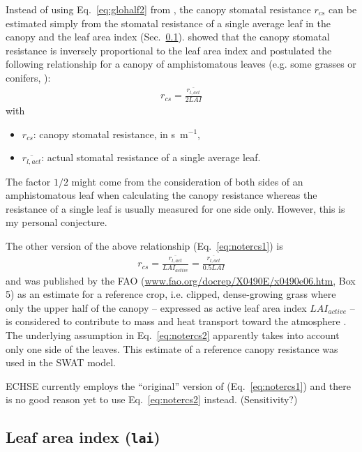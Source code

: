 \documentclass{scrreprt}
\newenvironment{denseitem}{
  \begin{itemize}
    \setlength{\itemsep}{0pt}
    \setlength{\parskip}{0pt}
    \setlength{\parsep}{0pt}
}{
  \end{itemize}
}
\begin{document}
Instead of using Eq.~\eqref{eq:glohalf2} from \citet{saugier91}, the canopy stomatal resistance $r_{cs}$ can be estimated simply from the stomatal resistance of a single average leaf in the canopy and the leaf area index (Sec.~\ref{ssec:parest_veg_lai}).
\citet{shuttleworth76} showed that the canopy stomatal resistance is inversely proportional to the leaf area index and postulated the following relationship for a canopy of amphistomatous leaves (e.g. some grasses or conifers, \citealt{shuttleworth85}):
\begin{align} \label{eq:notercs1}
  r_{cs} = \frac{\overline{r_{l,act}}}{2 LAI}
\end{align}
%
with
\begin{denseitem}
  \item[] $r_{cs}$: canopy stomatal resistance, in s~m$^{-1}$,
  \item[] $\overline{r_{l,act}}$: actual stomatal resistance of a single average leaf.
\end{denseitem}
%
The factor $1/2$ might come from the consideration of both sides of an amphistomatous leaf when calculating the canopy resistance whereas the resistance of a single leaf is usually measured for one side only.
However, this is my personal conjecture.

The other version of the above relationship (Eq.~\ref{eq:notercs1}) is
\begin{align} \label{eq:notercs2}
  r_{cs} = \frac{\overline{r_{l,act}}}{LAI_{active}} = \frac{\overline{r_{l,act}}}{0.5 LAI}
\end{align}
%
and was published by the FAO (\url{www.fao.org/docrep/X0490E/x0490e06.htm}, Box 5) as an estimate for a reference crop, i.e. clipped, dense-growing grass where only the upper half of the canopy -- expressed as active leaf area index $LAI_{active}$ -- is considered to contribute to mass and heat transport toward the atmosphere \citep{fao98}.
The underlying assumption in Eq.~\eqref{eq:notercs2} apparently takes into account only one side of the leaves.
This estimate of a reference canopy resistance was used in the SWAT model.

ECHSE currently employs the ``original'' version of \citet{shuttleworth85} (Eq.~\ref{eq:notercs1}) and there is no good reason yet to use Eq.~\eqref{eq:notercs2} instead.
(Sensitivity?)

\subsection{Leaf area index (\texttt{lai})} \label{ssec:parest_veg_lai}
\end{document}
